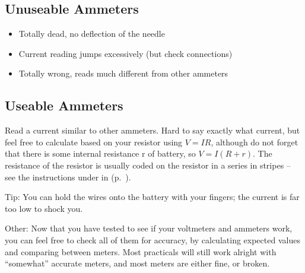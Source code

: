 \subsection{Unuseable Ammeters} 	
\begin{itemize}
\item{Totally dead, 
no deflection of the needle}
\item{Current reading jumps excessively (but check connections)}
\item{Totally wrong, 
reads much different from other ammeters}
\end{itemize}

\subsection{Useable Ammeters}
Read a current similar to other ammeters. 
Hard to say exactly what current, 
but feel free to calculate based on your resistor using $ V=IR $, 
although do not forget that there is 
some internal resistance r of battery, 
so $ V=I(R+r) $. 
The resistance of the resistor is usually coded 
on the resistor in a series in stripes -- 
see the instructions under  in  (p.~\pageref{sec:resistors}).

Tip: You can hold the wires onto the battery with your fingers; 
the current is far too low to shock you.

Other: Now that you have tested to see 
if your voltmeters and ammeters work, 
you can feel free to check all of them for accuracy, 
by calculating expected values and comparing between meters. 
Most practicals will still work alright with ``somewhat'' accurate meters, 
and most meters are either fine, 
or broken.
